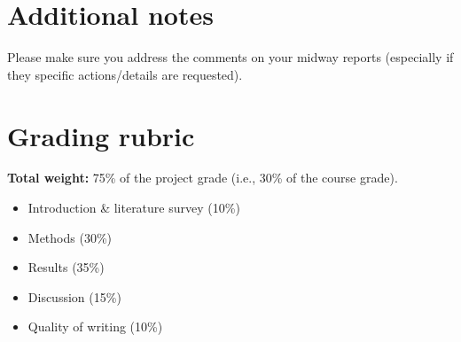 \section*{Additional notes}

Please make sure you address the comments on your midway reports (especially if they specific actions/details are requested).

\section*{Grading rubric}

\textbf{Total weight:} 75\% of the project grade (i.e., 30\% of the course grade).

\begin{itemize}[leftmargin=2em]
    \item Introduction \& literature survey (10\%)
    \item Methods (30\%)
    \item Results (35\%)
    \item Discussion (15\%)
    \item Quality of writing (10\%)
\end{itemize}